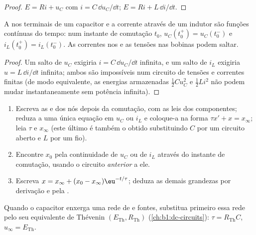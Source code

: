 \begin{proof}
 $E = Ri + u_C$ com $i = C\,\dd u_C/\dd t$; 
$E = Ri + L\,\dd i/\dd t$.
\end{proof}

\begin{proposition}\label{prop:b1:transient-regimes:continuity}
A  nos terminais de um capacitor e a corrente através de um indutor são
funções contínuas do tempo: num instante de comutação $t_0$,
$u_C(t_0^+) = u_C(t_0^-)$ e $i_L(t_0^+) = i_L(t_0^-)$. As correntes nos
 e as tensões nas bobinas podem saltar.
\end{proposition}

\begin{proof}
Um salto de $u_C$ exigiria $i = C\,\dd u_C/\dd t$ infinita, e um salto
de $i_L$ exigiria $u = L\,\dd i/\dd t$ infinita; ambos são
impossíveis num circuito de tensões e correntes finitas (de modo equivalente,
as energias armazenadas $\tfrac12 Cu_C^2$ e $\tfrac12 Li^2$ não podem mudar
instantaneamente sem potência infinita).
\end{proof}

\begin{method}\label{met:b1:transient-regimes:first}
\begin{enumerate}
  \item Escreva as  e dos nós depois da comutação, com as
        leis dos componentes; reduza a uma única equação em $u_C$ ou $i_L$ e
        coloque-a na forma $\tau x' + x = x_\infty$; leia $\tau$ e
        $x_\infty$ (este último é também o  obtido
        substituindo $C$ por um circuito aberto e $L$ por um fio).
  \item Encontre $x_0$ pela continuidade de $u_C$ ou de $i_L$ através do
        instante de comutação, usando o circuito \emph{anterior} a ele.
  \item Escreva $x = x_\infty + (x_0 - x_\infty)\eu^{-t/\tau}$; deduza
        as demais grandezas por derivação e pela .
\end{enumerate}
Quando o capacitor enxerga uma rede de  e fontes, substitua
primeiro essa rede pelo seu equivalente de Thévenin $(E_{\mathrm{Th}}, R_{\mathrm{Th}})$
(\cref{ch:b1:dc-circuits}): $\tau = R_{\mathrm{Th}}C$,
$u_\infty = E_{\mathrm{Th}}$.
\end{method}

